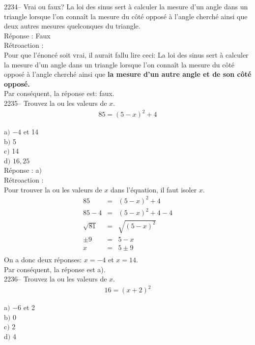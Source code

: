 \documentclass[letterpaper, 12pt]{article}
\begin{document}
2234-- Vrai ou faux? La loi des sinus sert \`a calculer la mesure d'un angle dans un triangle lorsque l'on conna\^it la mesure du c\^ot\'e oppos\'e \`a l'angle cherch\'e ainsi que deux autres mesures quelconques du triangle.\\

R\'eponse : Faux\\

R\'etroaction :\\
Pour que l'\'enonc\'e soit vrai, il aurait fallu lire ceci: \og La loi des sinus sert \`a calculer la mesure d'un angle dans un triangle lorsque l'on conna\^it la mesure du c\^ot\'e oppos\'e \`a l'angle cherch\'e ainsi que \textbf{la mesure d'un autre angle et de son c\^ot\'e oppos\'e.}\fg\\
Par cons\'equent, la r\'eponse est: faux.\\

2235-- Trouvez la ou les valeurs de $x$.\\
\begin{eqnarray*}
 85=(5-x)^{2}+4
\end{eqnarray*}

a$)$ $-4$ et 14\\
b$)$ 5\\
c$)$ 14\\
d$)$ $16,25$\\

R\'eponse : a$)$\\

R\'etroaction :\\
Pour trouver la ou les valeurs de $x$ dans l'\'equation, il faut isoler $x$.
\begin{eqnarray*}
 85&=&(5-x)^{2}+4\\
 85-4&=&(5-x)^{2}+4-4\\
 \sqrt{81}&=&\sqrt{(5-x)^{2}}\\
\pm9&=&5-x\\
x&=&5\pm9\\
\end{eqnarray*}
On a donc deux r\'eponses: $x=-4$ et $x=14$.\\
Par cons\'equent, la r\'eponse est a).\\

2236-- Trouvez la ou les valeurs de $x$.\\
\begin{eqnarray*}
 16=(x+2)^{2}
\end{eqnarray*}

a$)$ $-6$ et 2\\
b$)$ 0\\
c$)$ 2\\
d$)$ 4\\
\end{document}

